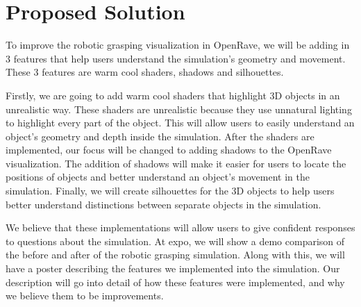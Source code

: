 \documentclass[10pt,journal,compsoc]{IEEEtran}
\begin{document}
\section{Proposed Solution}
To improve the robotic grasping visualization in OpenRave, we will be adding in 3 features that help users understand the simulation's geometry and movement. 
These 3 features are warm cool shaders, shadows and silhouettes. \par

Firstly, we are going to add warm cool shaders that highlight 3D objects in an unrealistic way. 
These shaders are unrealistic because they use unnatural lighting to highlight every part of the object. 
This will allow users to easily understand an object's geometry and depth inside the simulation.
After the shaders are implemented, our focus will be changed to adding shadows to the OpenRave visualization. 
The addition of shadows will make it easier for users to locate the positions of objects and better understand an object's movement in the simulation. 
Finally, we will create silhouettes for the 3D objects to help users better understand distinctions between separate objects in the simulation. \par

We believe that these implementations will allow users to give confident responses to questions about the simulation.
At expo, we will show a demo comparison of the before and after of the robotic grasping simulation. 
Along with this, we will have a poster describing the features we implemented into the simulation. 
Our description will go into detail of how these features were implemented, and why we believe them to be improvements.
\end{document}
